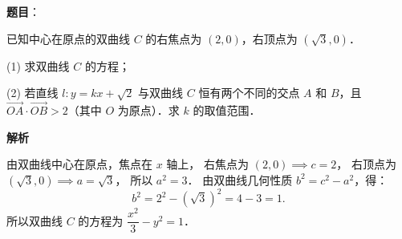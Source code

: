 \begin{answer}

\textbf{题目}：

已知中心在原点的双曲线 $C$ 的右焦点为 $(2, 0)$，右顶点为 $(\sqrt{3}, 0)$．

(1) 求双曲线 $C$ 的方程；

(2) 若直线 $l: y = kx + \sqrt{2}$ 与双曲线 $C$ 恒有两个不同的交点 $A$ 和 $B$，且 $\overrightarrow{OA} \cdot \overrightarrow{OB} > 2$（其中 $O$ 为原点）．求 $k$ 的取值范围．

\textbf{解析}


由双曲线中心在原点，焦点在 $x$ 轴上，
右焦点为 $(2, 0) \implies c = 2$，
右顶点为 $(\sqrt{3}, 0) \implies a = \sqrt{3}$，
所以 $a^2 = 3$．
由双曲线几何性质 $b^2 = c^2 - a^2$，得：
\nopagebreak[4]
\[
b^2 = 2^2 - (\sqrt{3})^2 = 4 - 3 = 1.
\]
所以双曲线 $C$ 的方程为 $\dfrac{x^2}{3} - y^2 = 1$．



\end{answer}
